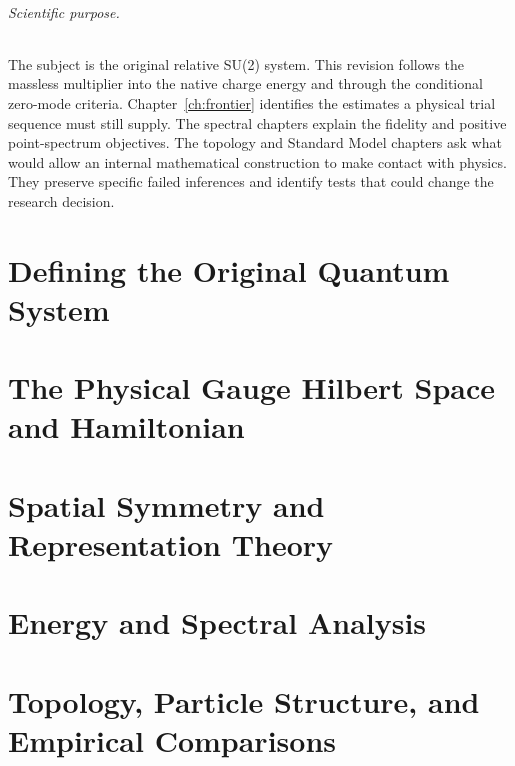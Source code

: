 \documentclass[11pt,oneside]{book}
\theoremstyle{definition}
\theoremstyle{remark}
\begin{document}
\paragraph{Scientific purpose.}
The subject is the original relative SU(2) system. This revision follows
the massless multiplier into the native charge energy and through the
conditional zero-mode criteria. Chapter~\ref{ch:frontier} identifies
the estimates a physical trial sequence must still supply. The
spectral chapters explain the fidelity and positive point-spectrum
objectives. The topology and Standard Model chapters ask what would
allow an internal
mathematical construction to make contact with physics. They preserve
specific failed inferences and identify tests that could change the
research decision.

\tableofcontents
\mainmatter
\part{Defining the Original Quantum System}






\part{The Physical Gauge Hilbert Space and Hamiltonian}




\part{Spatial Symmetry and Representation Theory}





\part{Energy and Spectral Analysis}





\part{Topology, Particle Structure, and Empirical Comparisons}




\end{document}
